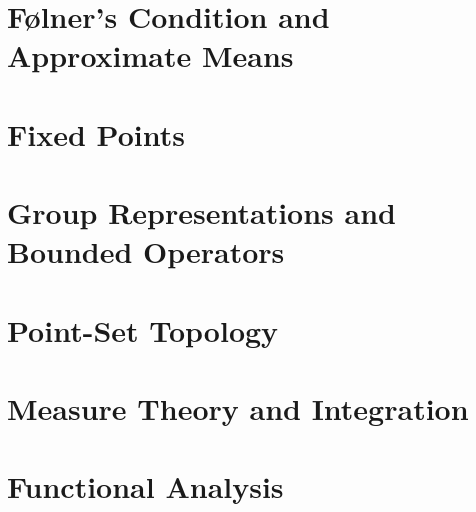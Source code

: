 \documentclass[10pt]{package2}
\newcommand{\1}{\mathds{1}}
\begin{document}
\chapter{Følner's Condition and Approximate Means}

\chapter{Fixed Points}
\chapter{Group Representations and Bounded Operators}
\appendix
\chapter{Point-Set Topology}

\chapter{Measure Theory and Integration}

\chapter{Functional Analysis}

\nocite{*}
\printbibliography
\end{document}
